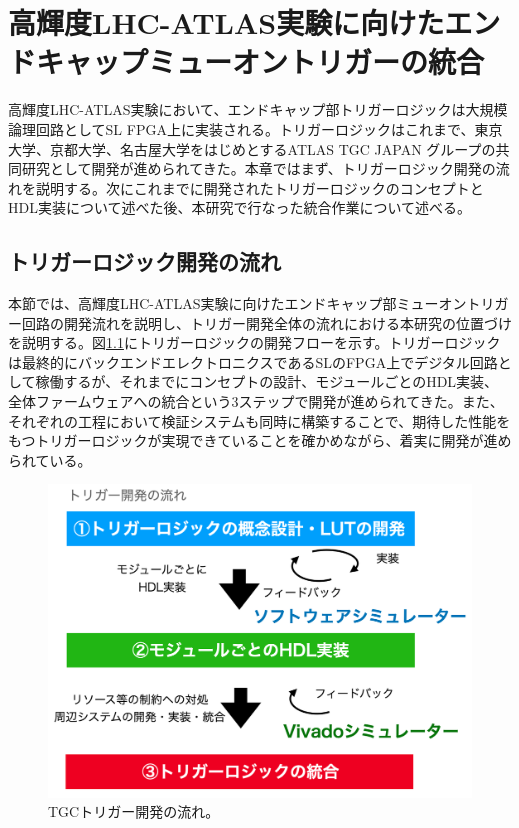 \chapter{高輝度LHC-ATLAS実験に向けたエンドキャップミューオントリガーの統合}
\label{chap_TriggerIntegration}
高輝度LHC-ATLAS実験において、エンドキャップ部トリガーロジックは大規模論理回路としてSL FPGA上に実装される。トリガーロジックはこれまで、東京大学、京都大学、名古屋大学をはじめとするATLAS TGC JAPAN グループの共同研究として開発が進められてきた。本章ではまず、トリガーロジック開発の流れを説明する。次にこれまでに開発されたトリガーロジックのコンセプトとHDL実装について述べた後、本研究で行なった統合作業について述べる。

\section{トリガーロジック開発の流れ}
\label{sec_TriggerTestSystem}
本節では、高輝度LHC-ATLAS実験に向けたエンドキャップ部ミューオントリガー回路の開発流れを説明し、トリガー開発全体の流れにおける本研究の位置づけを説明する。図\ref{Trigger_flow}にトリガーロジックの開発フローを示す。トリガーロジックは最終的にバックエンドエレクトロニクスであるSLのFPGA上でデジタル回路として稼働するが、それまでにコンセプトの設計、モジュールごとのHDL実装、全体ファームウェアへの統合という3ステップで開発が進められてきた。また、それぞれの工程において検証システムも同時に構築することで、期待した性能をもつトリガーロジックが実現できていることを確かめながら、着実に開発が進められている。

\begin{figure} 
\centering
\includegraphics[width=16cm]{fig/SL/Trigger_flow.png}
\caption[TGCトリガー開発の流れ]{TGCトリガー開発の流れ。}
\label{Trigger_flow}
\end{figure}

